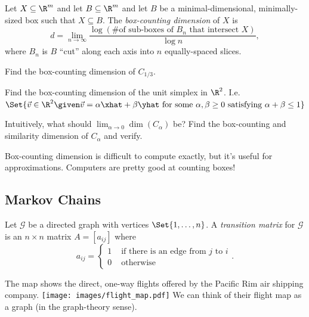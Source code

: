 	\begin{definition}
		Let $X\subseteq \R^m$ and let $B\subseteq \R^m$ and let $B$ be a minimal-dimensional, minimally-sized box such
		that $X\subseteq B$. The \emph{box-counting dimension} of $X$ is
		\[
			d=\lim_{n\to\infty} \frac{\log(\text{\# of sub-boxes of $B_n$ that intersect $X$})}{\log n},
		\]
		where $B_n$ is $B$ ``cut'' along each axis into $n$ equally-spaced slices.
	\end{definition}

	\begin{parts}[resume]
		\item Find the box-counting dimension of $C_{1/3}$.
		\item Find the box-counting dimension of the unit simplex in $\R^2$. I.e. $\Set{\vec v\in \R^2\given \vec v=
			\alpha\xhat+\beta \yhat\text{ for some }\alpha,\beta\geq 0\text{ satisfying }\alpha+\beta \leq 1
			}$
		\item Intuitively, what should $\lim_{\alpha\to 0} \dim(C_\alpha)$ be? Find the box-counting and similarity
			dimension of $C_\alpha$ and verify.
	\end{parts}
	
	Box-counting dimension is difficult to compute exactly, but it's useful for approximations. Computers are
	pretty good at counting boxes!

	\newpage
	\subsection*{Markov Chains}
	
	\begin{definition}
		Let $\mathcal G$ be a directed graph with vertices $\Set{1,\ldots, n}$.
		A \emph{transition matrix} for $\mathcal G$ is an $n\times n$ matrix $A=[a_{ij}]$ where
		\[
			a_{ij} = \begin{cases}
				1 &\text{ if there is an edge from $j$ to $i$}\\
				0 &\text{ otherwise}
			\end{cases}.
		\]
	\end{definition}

	\question
	The map shows the direct, one-way flights offered by the Pacific
	Rim air shipping company.
	\texttt{[image: images/flight\_map.pdf]}
	We can think of their flight map as a graph (in the graph-theory sense).


